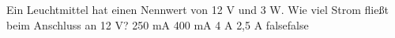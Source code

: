    {Ein Leuchtmittel hat einen Nennwert von 12 V und 3 W. Wie viel Strom fließt beim Anschluss an 12 V?}
    {250 mA}
    {400 mA}
    {4 A}
    {2,5 A}
    {false}{false}